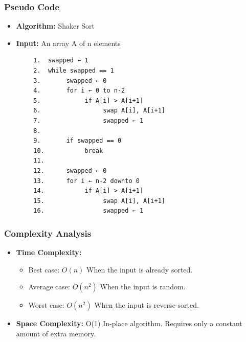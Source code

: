     \subsubsection{Pseudo Code}
        \begin{itemize}
            \item \textbf{Algorithm:} Shaker Sort
            \item \textbf{Input:} An array A of n elements
        \end{itemize}
        \begin{verbatim}
        1.  swapped ← 1
        2.  while swapped == 1
        3.       swapped ← 0
        4.       for i ← 0 to n-2
        5.            if A[i] > A[i+1]
        6.                 swap A[i], A[i+1]
        7.                 swapped ← 1
        8.
        9.       if swapped == 0
        10.           break
        11.
        12.      swapped ← 0
        13.      for i ← n-2 downto 0
        14.           if A[i] > A[i+1]
        15.                swap A[i], A[i+1]
        16.                swapped ← 1
        \end{verbatim}
    \subsubsection{Complexity Analysis}
        \begin{itemize}
            \item \textbf{Time Complexity:}
            \begin{itemize}
                \item Best case: $O(n)$
                    \subitem When the input is already sorted.
                \item Average case: $O(n^2)$
                    \subitem When the input is random.
                \item Worst case: $O(n^2)$ 
                    \subitem When the input is reverse-sorted.
            \end{itemize}
            \item \textbf{Space Complexity:} O(1) 
                \subitem In-place algorithm. Requires only a constant amount of extra memory.
        \end{itemize}
        
